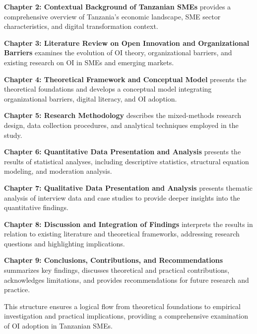 \textbf{Chapter 2: Contextual Background of Tanzanian SMEs} provides a comprehensive overview of Tanzania's economic landscape, SME sector characteristics, and digital transformation context.

\textbf{Chapter 3: Literature Review on Open Innovation and Organizational Barriers} examines the evolution of OI theory, organizational barriers, and existing research on OI in SMEs and emerging markets.

\textbf{Chapter 4: Theoretical Framework and Conceptual Model} presents the theoretical foundations and develops a conceptual model integrating organizational barriers, digital literacy, and OI adoption.

\textbf{Chapter 5: Research Methodology} describes the mixed-methods research design, data collection procedures, and analytical techniques employed in the study.

\textbf{Chapter 6: Quantitative Data Presentation and Analysis} presents the results of statistical analyses, including descriptive statistics, structural equation modeling, and moderation analysis.

\textbf{Chapter 7: Qualitative Data Presentation and Analysis} presents thematic analysis of interview data and case studies to provide deeper insights into the quantitative findings.

\textbf{Chapter 8: Discussion and Integration of Findings} interprets the results in relation to existing literature and theoretical frameworks, addressing research questions and highlighting implications.

\textbf{Chapter 9: Conclusions, Contributions, and Recommendations} summarizes key findings, discusses theoretical and practical contributions, acknowledges limitations, and provides recommendations for future research and practice.

This structure ensures a logical flow from theoretical foundations to empirical investigation and practical implications, providing a comprehensive examination of OI adoption in Tanzanian SMEs.